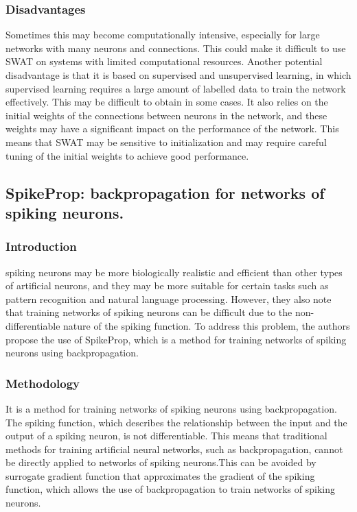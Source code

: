 \subsubsection{Disadvantages}
Sometimes this may become computationally intensive, especially for large
networks with many neurons and connections. This could make it difficult to use
SWAT on systems with limited computational resources. Another potential
disadvantage is that it is based on supervised and unsupervised learning, in
which supervised learning requires a large amount of labelled data to train the
network effectively. This may be difficult to obtain in some cases. It also
relies on the initial weights of the connections between neurons in the
network, and these weights may have a significant impact on the performance of
the network. This means that SWAT may be sensitive to initialization and may
require careful tuning of the initial weights to achieve good performance.
\subsection{SpikeProp: backpropagation for networks of spiking neurons.}
\subsubsection{Introduction}
spiking neurons may be more biologically realistic and efficient than other
types of artificial neurons, and they may be more suitable for certain tasks
such as pattern recognition and natural language processing. However, they also
note that training networks of spiking neurons can be difficult due to the
non-differentiable nature of the spiking function. To address this problem, the
authors propose the use of SpikeProp\cite{spikeprop}, which is a method for
training networks of spiking neurons using backpropagation.
\subsubsection{Methodology}
It is a method for training networks of spiking neurons using backpropagation.
The spiking function, which describes the relationship between the input and
the output of a spiking neuron, is not differentiable. This means that
traditional methods for training artificial neural networks, such as
backpropagation, cannot be directly applied to networks of spiking neurons.This
can be avoided by surrogate gradient function that approximates the gradient of
the spiking function, which allows the use of backpropagation to train networks
of spiking neurons.

